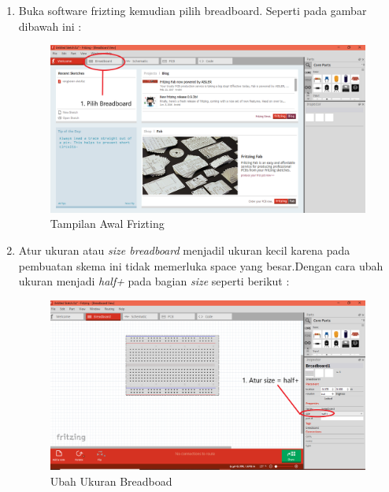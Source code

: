 \begin{enumerate}
    \item Buka software frizting kemudian pilih breadboard. Seperti pada gambar dibawah ini :
    \begin{figure}[H]
    \centering
    \includegraphics[width=1.1\textwidth]{figures/tutor1.png}
    \caption{Tampilan Awal Frizting }
    \label{print}
    \end{figure}
    \item Atur ukuran atau \textit{size breadboard} menjadil ukuran kecil karena pada pembuatan skema ini tidak memerluka space yang besar.Dengan cara ubah ukuran menjadi \textit{half+} pada bagian \textit{size} seperti berikut :
    \begin{figure}[H]
    \centering
    \includegraphics[width=1.1\textwidth]{figures/tutor2.png}
    \caption{Ubah Ukuran Breadboad }
    \label{print}
    \end{figure}
    

\end{enumerate}
